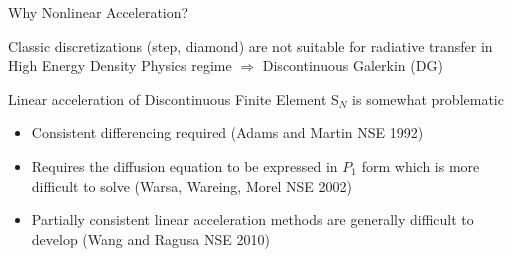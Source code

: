 \documentclass[10pt]{beamer}
\newcommand{\SN}{S$_N$\xspace}
\begin{document}
\begin{frame}{Why Nonlinear Acceleration?}


		Classic discretizations (step, diamond) are not suitable for radiative transfer in High Energy Density Physics regime $\Rightarrow$ Discontinuous Galerkin (DG) 

		Linear acceleration of Discontinuous Finite Element \SN is somewhat problematic 
		\begin{itemize}
			\item Consistent differencing required (Adams and Martin NSE 1992)

			\item Requires the diffusion equation to be expressed in $P_1$ form which is more difficult to solve (Warsa, Wareing, Morel NSE 2002) 

			\item Partially consistent linear acceleration methods are generally difficult to develop (Wang and Ragusa NSE 2010)

		\end{itemize}


\end{frame}
\end{document}
